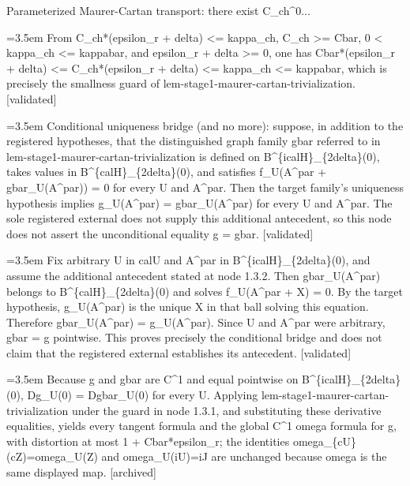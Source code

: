 \documentclass{article}
\newcommand{\step}[1]{\par\noindent\hangindent=3.5em\hangafter=1%
  \makebox[3.5em][l]{\textbf{#1.}}}
\newcommand{\steptag}[1]{\hfill{\small\textsf{[#1]}}}
\begin{document}
\begin{proofbox}{Parameterized Maurer-Cartan transport: there exist C\_ch\textasciicircum{}0...}
\step{1.3.1} From C\_ch*(epsilon\_r + delta) <= kappa\_ch, C\_ch >= Cbar, 0 < kappa\_ch <= kappabar, and epsilon\_r + delta >= 0, one has Cbar*(epsilon\_r + delta) <= C\_ch*(epsilon\_r + delta) <= kappa\_ch <= kappabar, which is precisely the smallness guard of lem-stage1-maurer-cartan-trivialization. \steptag{validated} \\[4pt]
\step{1.3.2} Conditional uniqueness bridge (and no more): suppose, in addition to the registered hypotheses, that the distinguished graph family gbar referred to in lem-stage1-maurer-cartan-trivialization is defined on B\textasciicircum{}\{icalH\}\_\{2delta\}(0), takes values in B\textasciicircum{}\{calH\}\_\{2delta\}(0), and satisfies f\_U(A\textasciicircum{}par + gbar\_U(A\textasciicircum{}par)) = 0 for every U and A\textasciicircum{}par. Then the target family's uniqueness hypothesis implies g\_U(A\textasciicircum{}par) = gbar\_U(A\textasciicircum{}par) for every U and A\textasciicircum{}par. The sole registered external does not supply this additional antecedent, so this node does not assert the unconditional equality g = gbar. \steptag{validated} \\[6pt]
\step{1.3.2.1} Fix arbitrary U in calU and A\textasciicircum{}par in B\textasciicircum{}\{icalH\}\_\{2delta\}(0), and assume the additional antecedent stated at node 1.3.2. Then gbar\_U(A\textasciicircum{}par) belongs to B\textasciicircum{}\{calH\}\_\{2delta\}(0) and solves f\_U(A\textasciicircum{}par + X) = 0. By the target hypothesis, g\_U(A\textasciicircum{}par) is the unique X in that ball solving this equation. Therefore gbar\_U(A\textasciicircum{}par) = g\_U(A\textasciicircum{}par). Since U and A\textasciicircum{}par were arbitrary, gbar = g pointwise. This proves precisely the conditional bridge and does not claim that the registered external establishes its antecedent. \steptag{validated} \\[4pt]
\step{1.3.3} Because g and gbar are C\textasciicircum{}1 and equal pointwise on B\textasciicircum{}\{icalH\}\_\{2delta\}(0), Dg\_U(0) = Dgbar\_U(0) for every U. Applying lem-stage1-maurer-cartan-trivialization under the guard in node 1.3.1, and substituting these derivative equalities, yields every tangent formula and the global C\textasciicircum{}1 omega formula for g, with distortion at most 1 + Cbar*epsilon\_r; the identities omega\_\{cU\}(cZ)=omega\_U(Z) and omega\_U(iU)=iJ are unchanged because omega is the same displayed map. \steptag{archived} \\[4pt]

\end{proofbox}
\end{document}
